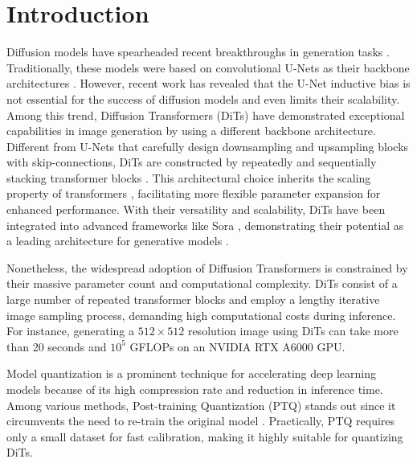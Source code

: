 \documentclass[10pt,a4paper]{article}
\begin{document}
\section{Introduction}

Diffusion models have spearheaded recent breakthroughs in generation tasks \cite{yang2023diffusion,croitoru2023diffusion}. Traditionally, these models were based on convolutional U-Nets \cite{ronneberger2015u} as their backbone architectures \cite{sohl2015deep,ho2020denoising,dhariwal2021diffusion,rombach2022high}. However, recent work \cite{bao2022all,yang2022your,liu2024sora} has revealed that the U-Net inductive bias is not essential for the success of diffusion models and even limits their scalability. Among this trend, Diffusion Transformers (DiTs) \cite{peebles2023scalable} have demonstrated exceptional capabilities in image generation by using a different backbone architecture. Different from U-Nets that carefully design downsampling and upsampling blocks with skip-connections, DiTs are constructed by repeatedly and sequentially stacking transformer blocks \cite{vaswani2017attention}. This architectural choice inherits the scaling property of transformers \cite{carion2020end,touvron2021training,xie2021segformer,liu2021swin}, facilitating more flexible parameter expansion for enhanced performance. With their versatility and scalability, DiTs have been integrated into advanced frameworks like Sora \cite{brooks2024video}, demonstrating their potential as a leading architecture for generative models \cite{gao2023masked,chen2024pixart,liu2024sora,zhu2024sora}.

Nonetheless, the widespread adoption of Diffusion Transformers is constrained by their massive parameter count and computational complexity. DiTs consist of a large number of repeated transformer blocks and employ a lengthy iterative image sampling process, demanding high computational costs during inference. For instance, generating a $512 \times 512$ resolution image using DiTs can take more than 20 seconds and $10^5$ GFLOPs on an NVIDIA RTX A6000 GPU.

Model quantization \cite{nagel2021white,nagel2020up,liu2023oscillation} is a prominent technique for accelerating deep learning models because of its high compression rate and reduction in inference time. Among various methods, Post-training Quantization (PTQ) stands out since it circumvents the need to re-train the original model \cite{yuan2022ptq4vit,shang2023post,li2023q,zhang2024magr}. Practically, PTQ requires only a small dataset for fast calibration, making it highly suitable for quantizing DiTs.
\end{document}
